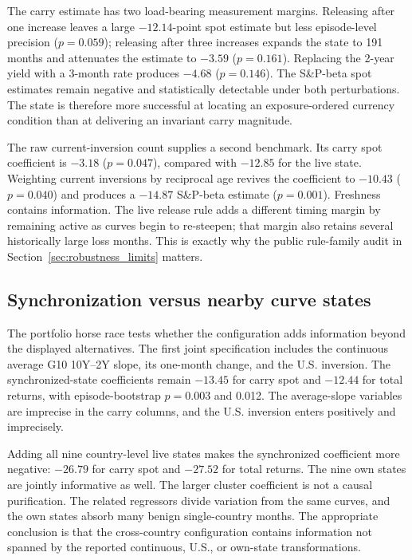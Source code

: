 
The carry estimate has two load-bearing measurement margins. Releasing after one increase leaves a large $-12.14$-point spot estimate but less episode-level precision ($p=0.059$); releasing after three increases expands the state to 191 months and attenuates the estimate to $-3.59$ ($p=0.161$). Replacing the 2-year yield with a 3-month rate produces $-4.68$ ($p=0.146$). The S\&P-beta spot estimates remain negative and statistically detectable under both perturbations. The state is therefore more successful at locating an exposure-ordered currency condition than at delivering an invariant carry magnitude.

The raw current-inversion count supplies a second benchmark. Its carry spot coefficient is $-3.18$ ($p=0.047$), compared with $-12.85$ for the live state. Weighting current inversions by reciprocal age revives the coefficient to $-10.43$ ($p=0.040$) and produces a $-14.87$ S\&P-beta estimate ($p=0.001$). Freshness contains information. The live release rule adds a different timing margin by remaining active as curves begin to re-steepen; that margin also retains several historically large loss months. This is exactly why the public rule-family audit in Section~\ref{sec:robustness_limits} matters.

\subsection{Synchronization versus nearby curve states}

The portfolio horse race tests whether the configuration adds information beyond the displayed alternatives. The first joint specification includes the continuous average G10 10Y--2Y slope, its one-month change, and the U.S. inversion. The synchronized-state coefficients remain $-13.45$ for carry spot and $-12.44$ for total returns, with episode-bootstrap $p=0.003$ and 0.012. The average-slope variables are imprecise in the carry columns, and the U.S. inversion enters positively and imprecisely.

Adding all nine country-level live states makes the synchronized coefficient more negative: $-26.79$ for carry spot and $-27.52$ for total returns. The nine own states are jointly informative as well. The larger cluster coefficient is not a causal purification. The related regressors divide variation from the same curves, and the own states absorb many benign single-country months. The appropriate conclusion is that the cross-country configuration contains information not spanned by the reported continuous, U.S., or own-state transformations.

